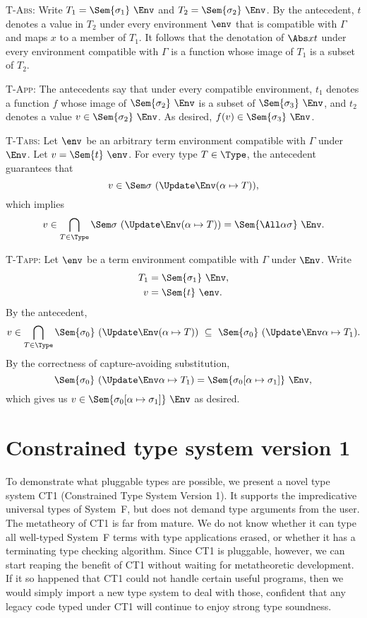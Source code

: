 \documentclass{amsart}
\begin{document}
\textsc{T-Abs}: Write $T_1=\Sem{\sigma_1}~\Env$ and
$T_2=\Sem{\sigma_2}~\Env$. By the antecedent, $t$ denotes a value
in $T_2$ under every environment $\env$ that is compatible with
$\Gamma$ and maps $x$ to a member of $T_1$. It follows that the
denotation of $\Abs xt$ under every environment compatible with
$\Gamma$ is a function whose image of $T_1$ is a subset of $T_2$.

\textsc{T-App}: The antecedents say that under every
compatible environment, $t_1$ denotes a function $f$ whose image
of $\Sem{\sigma_2}~\Env$ is a subset of $\Sem{\sigma_3}~\Env$,
and $t_2$ denotes a value $v\in\Sem{\sigma_2}~\Env$. As desired,
$f(v)\in\Sem{\sigma_3}~\Env$.

\textsc{T-Tabs}: Let $\env$ be an arbitrary term environment
compatible with $\Gamma$ under $\Env$. Let $v=\Sem{t}~\env$.
For every type $T\in\Type$, the antecedent guarantees that
\[
v\in\Sem\sigma~(\Update\Env(\alpha\mapsto T)),
\]
which implies
\[
v\in\bigcap_{T\in\Type}\Sem\sigma~(\Update\Env(\alpha\mapsto T))
=\Sem{\All\alpha\sigma}~\Env.
\]

\textsc{T-Tapp}: Let $\env$ be a term environment compatible with
$\Gamma$ under $\Env$. Write
\begin{align*}
T_1&=\Sem{\sigma_1}~\Env,\\
v&=\Sem{t}~\env.
\end{align*}
By the antecedent,
\[
v\in
\bigcap_{T\in\Type}\Sem{\sigma_0}~(\Update\Env(\alpha\mapsto T))
\ \subseteq\ \Sem{\sigma_0}~(\Update\Env\alpha\mapsto T_1).
\]
By the correctness of capture-avoiding substitution,
\[
\Sem{\sigma_0}~(\Update\Env\alpha\mapsto T_1)
=
\Sem{\sigma_0[\alpha\mapsto\sigma_1]}~\Env,
\]
which gives us $v\in\Sem{\sigma_0[\alpha\mapsto\sigma_1]}~\Env$
as desired.


\section{Constrained type system version 1}

To demonstrate what pluggable types are possible, we present a
novel type system CT1 (Constrained Type System Version 1). It
supports the impredicative universal types of System~F, but does
not demand type arguments from the user. The metatheory of CT1 is
far from mature. We do not know whether it can type all
well-typed System~F terms with type applications erased, or
whether it has a terminating type checking algorithm. Since CT1
is pluggable, however, we can start reaping the benefit of CT1
without waiting for metatheoretic development. If it so happened
that CT1 could not handle certain useful programs, then we would
simply import a new type system to deal with those, confident
that any legacy code typed under CT1 will continue to enjoy
strong type soundness.
\end{document}
